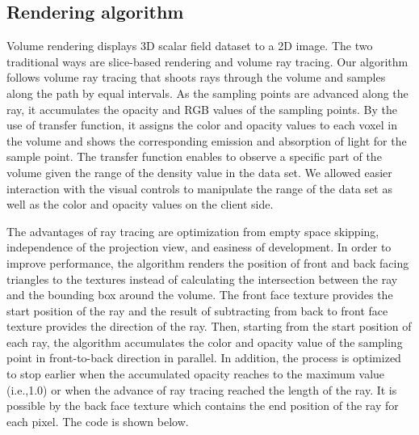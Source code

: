 \documentclass[annual]{acmsiggraph}
\begin{document}
\subsection{Rendering algorithm}
	Volume rendering displays 3D scalar field dataset to a 2D image. The two traditional ways are slice-based rendering and volume ray tracing. Our algorithm follows volume ray tracing that shoots rays through the volume and samples along the path by equal intervals. As the sampling points are advanced along the ray, it accumulates the opacity and RGB values of the sampling points. By the use of transfer function, it assigns the color and opacity values to each voxel in the volume and shows the corresponding emission and absorption of light for the sample point. The transfer function enables to observe a specific part of the volume given the range of the density value in the data set. We allowed easier interaction with the visual controls to manipulate the range of the data set as well as the color and opacity values on the client side. 
	
	The advantages of ray tracing are optimization from empty space skipping, independence of the projection view, and easiness of development. In order to improve performance, the algorithm renders the position of front and back facing triangles to the textures instead of calculating the intersection between the ray and the bounding box around the volume. The front face texture provides the start position of the ray and the result of subtracting from back to front face texture provides the direction of the ray. Then, starting from the start position of each ray, the algorithm accumulates the color and opacity value of the sampling point in front-to-back direction in parallel. In addition, the process is optimized to stop earlier when the accumulated opacity reaches to the maximum value (i.e.,1.0) or when the advance of ray tracing reached the length of the ray. It is possible by the back face texture which contains the end position of the ray for each pixel. The code is shown below.
\end{document}
